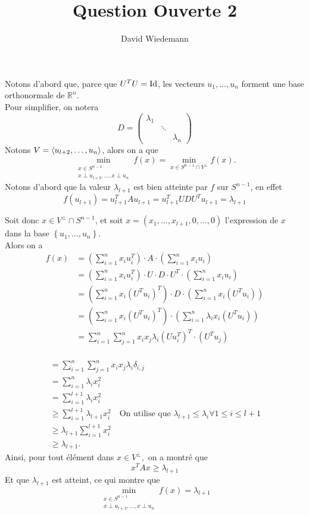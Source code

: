 \documentclass[11pt, a4paper]{article}
\begin{document}
\title{Question Ouverte 2}
\author{David Wiedemann}
\maketitle
Notons d'abord que, parce que $U^{T}U = \operatorname*{Id}$, les vecteurs  $u_1, \ldots, u_n$ forment une base orthonormale de $ \mathbb{R}^n$.\\
Pour simplifier, on notera
\[ 
D = \begin{pmatrix}
	\lambda_1 & & \\
		  & \ddots & \\
		  & & \lambda_n
\end{pmatrix} 
\]
Notons $V= \left\langle u_{l+2}, \ldots, u_{n}  \right\rangle $, alors on a que
\[ 
	\min _{ \substack { x \in S^{n-1}\\ x \perp u_{l +2}, \ldots, x \perp u_{n} } } f( x) = \min _{x \in S^{n-1}\cap V^{\perp}} f( x) .
\]
Notons d'abord que la valeur $\lambda_{l+1} $ est bien atteinte par $f$ sur $S^{n-1} $, en effet
\[ 
	f( u_{l+1} ) = u_{l+1}^{T} A u_{l+1}  = u_{l+1} ^{T} U D U^{T} u_{l+1} = \lambda_{l+1} 
\]

Soit donc $x \in V^{\perp} \cap S^{n-1}$, et soit $x = ( x_1, \ldots, x_{l+1} , 0 ,\ldots, 0) $ l'expression de $x$ dans la base $ \left\{ u_1, \ldots, u_n \right\} $.\\
Alors on a 
\begin{align*}
	f( x) &= \left( \sum_{i=1}^{ n} x_i u_i^{T}\right) \cdot A \cdot\left( \sum_{i=1}^{ n} x_i u_i\right) \\
	&= \left( \sum_{i=1}^{ n} x_i u_i^{T}\right)\cdot U\cdot D\cdot U ^{T}\cdot\left( \sum_{i=1}^{ n} x_i u_i\right)\\
	&= \left( \sum_{i=1}^{ n} x_i ( U ^{T}u_i)^{T} \right)\cdot D  \cdot\left( \sum_{i=1}^{ n} x_i ( U^{T}u_i )\right)\\
	&= \left( \sum_{i=1}^{ n} x_i ( U ^{T}u_i)^{T} \right) \cdot  \left( \sum_{i=1}^{ n}\lambda_i x_i ( U^{T}u_i )\right)\\
	&=  \sum_{i=1}^{ n}\sum_{j=1}^{ n} x_i x_j  \lambda_i  ( Uu_i^{T} )^{T}\cdot( U ^{T}u_j)\\
	\end{align*}
	
	\begin{align*}
	&=  \sum_{i=1}^{ n}\sum_{j=1}^{ n} x_i x_j  \lambda_i  \delta_{i,j} \\
	&= \sum_{i=1}^{ n}\lambda_i x_{i}^{2} \\
	&= \sum_{i=1}^{ l+1}\lambda_i x_i^{2}\\
	& \geq \sum_{i=1}^{ l+1}\lambda_{l+1} x_i^{2}\quad  \text {On utilise que $\lambda_{l+1} \leq  \lambda_i \forall 1 \leq  i \leq l+1 $ } \\
	& \geq  \lambda_{l+1} \sum_{i=1}^{ l+1}x_i^{2}\\
	& \geq \lambda_{l+1} .
\end{align*}
Ainsi, pour tout élément dans $x \in V^{\perp},$ on a montré que
\[ 
x^{T} A x \geq \lambda_{l+1} 
\]
Et que $\lambda_{l+1} $ est atteint, ce qui montre que
\[ 	\min _{ \substack { x \in S^{n-1}\\ x \perp u_{l +2}, \ldots, x \perp u_{n} } } f( x) = \lambda_{l+1} 	
\]
\end{document}
